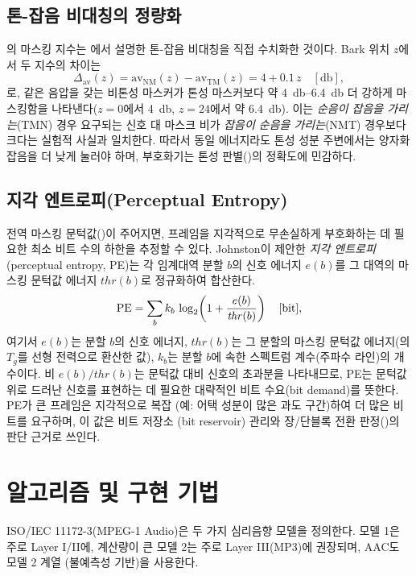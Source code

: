 \documentclass[11pt,a4paper]{article}
\begin{document}
\subsection{톤-잡음 비대칭의 정량화}
의 마스킹 지수는 에서 설명한 톤-잡음
비대칭을 직접 수치화한 것이다. Bark 위치 $z$에서 두 지수의 차이는
\begin{equation}\label{eq:tmnnmt}
  \Delta_{\mathrm{av}}(z) = \mathrm{av}_{\mathrm{NM}}(z) - \mathrm{av}_{\mathrm{TM}}(z)
     = 4 + 0.1\,z \quad [\si{\decibel}],
\end{equation}
로, 같은 음압을 갖는 비톤성 마스커가 톤성 마스커보다 약 \SIrange{4}{6.4}{\decibel}
더 강하게 마스킹함을 나타낸다($z=0$에서 \SI{4}{\decibel}, $z=24$에서 약
\SI{6.4}{\decibel}). 이는 \emph{순음이 잡음을 가리는}(TMN) 경우 요구되는
신호 대 마스크 비가 \emph{잡음이 순음을 가리는}(NMT) 경우보다 크다는 실험적
사실과 일치한다. 따라서 동일 에너지라도 톤성 성분 주변에서는 양자화 잡음을 더
낮게 눌러야 하며, 부호화기는 톤성 판별()의 정확도에 민감하다.

\subsection{지각 엔트로피(Perceptual Entropy)}
전역 마스킹 문턱값()이 주어지면, 프레임을 지각적으로 무손실하게
부호화하는 데 필요한 최소 비트 수의 하한을 추정할 수 있다. Johnston이 제안한
\emph{지각 엔트로피}(perceptual entropy, PE)는 각 임계대역 분할 $b$의 신호
에너지 $e(b)$를 그 대역의 마스킹 문턱값 에너지 $\mathit{thr}(b)$로 정규화하여
합산한다.
\begin{equation}\label{eq:pe}
  \mathrm{PE} = \sum_{b} k_{b}\,
     \log_{2}\!\left(1 + \frac{e(b)}{\mathit{thr}(b)}\right)
     \quad [\si{\bit}],
\end{equation}
여기서 $e(b)$는 분할 $b$의 신호 에너지, $\mathit{thr}(b)$는 그 분할의 마스킹
문턱값 에너지(의 $T_{g}$를 선형 전력으로 환산한 값), $k_{b}$는
분할 $b$에 속한 스펙트럼 계수(주파수 라인)의 개수이다. 비 $e(b)/\mathit{thr}(b)$는
문턱값 대비 신호의 초과분을 나타내므로, PE는 문턱값 위로 드러난 신호를 표현하는 데
필요한 대략적인 비트 수요(bit demand)를 뜻한다. PE가 큰 프레임은 지각적으로 복잡
(예: 어택 성분이 많은 과도 구간)하여 더 많은 비트를 요구하며, 이 값은 비트 저장소
(bit reservoir) 관리와 장/단블록 전환 판정()의 판단 근거로
쓰인다.

\section{알고리즘 및 구현 기법}\label{sec:algorithm}
ISO/IEC 11172-3(MPEG-1 Audio)은 두 가지 심리음향 모델을 정의한다. 모델 1은 주로
Layer I/II에, 계산량이 큰 모델 2는 주로 Layer III(MP3)에 권장되며, AAC도 모델 2 계열
(불예측성 기반)을 사용한다.
\end{document}
